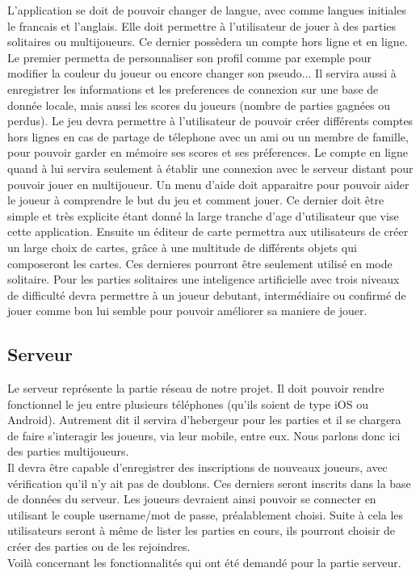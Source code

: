 	L'application se doit de pouvoir changer de langue, avec comme langues initiales le francais et l'anglais.
	Elle doit permettre à l'utilisateur de jouer à des parties solitaires ou multijoueurs. 
	Ce dernier possèdera un compte hors ligne et en ligne.		
	Le premier permetta de personnaliser son profil comme par exemple pour modifier
	la couleur du joueur ou encore changer son pseudo... Il servira aussi à enregistrer les informations
	et les preferences de connexion sur une base de donnée locale,
	mais aussi les scores du joueurs (nombre de parties gagnées ou perdus). 
	Le jeu devra permettre à l'utilisateur de pouvoir créer différents comptes hors lignes en cas de partage de télephone
	avec un ami ou un membre de famille, pour pouvoir garder en mémoire ses scores et ses préferences.		
	Le compte en ligne quand à lui servira seulement à établir une connexion avec le serveur distant pour pouvoir jouer en multijoueur.		
	Un menu d'aide doit apparaitre pour pouvoir aider le joueur à comprendre le but du jeu et comment jouer. 
	Ce dernier doit être simple et très explicite étant donné la large tranche d'age d'utilisateur que vise cette application.		
	Ensuite un éditeur de carte permettra aux utilisateurs de créer un large choix de cartes, 
	grâce à une multitude de différents objets qui composeront les cartes. Ces dernieres pourront être seulement utilisé en mode solitaire.
	Pour les parties solitaires une inteligence artificielle avec trois niveaux de difficulté 
	devra permettre à un joueur debutant, intermédiaire ou confirmé de jouer comme bon lui semble pour pouvoir améliorer sa maniere de jouer.
	
\subsection{Serveur}
	
	Le serveur représente la partie réseau de notre projet. Il doit pouvoir
	rendre fonctionnel le jeu entre plusieurs téléphones (qu'ils soient de type
	iOS ou Android). Autrement dit il servira d'hebergeur pour les parties et
	il se chargera de faire s'interagir les joueurs, via leur mobile, entre eux.
	Nous parlons donc ici des parties multijoueurs.\\ 
	Il devra être capable d'enregistrer des inscriptions de nouveaux joueurs, avec
	vérification qu'il n'y ait pas de doublons. Ces derniers seront inscrits dans 
	la base de données du serveur. Les joueurs devraient ainsi
	pouvoir se connecter en utilisant le couple username/mot de passe,
	préalablement choisi. Suite à cela les utilisateurs seront à même de lister
	les parties en cours, ils pourront choisir de créer des parties ou de les rejoindres.\\
	Voilà concernant les fonctionnalités qui ont été demandé pour la partie
	serveur.